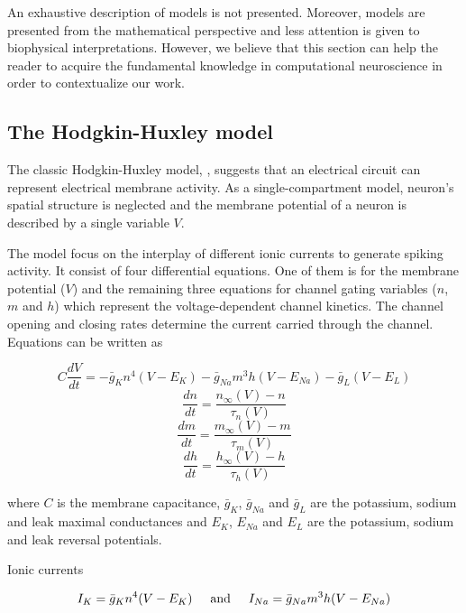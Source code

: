 An exhaustive description of models is not presented. Moreover, models are presented from the mathematical perspective and less attention is given to biophysical interpretations. However, we believe that this section can help the reader to acquire the fundamental knowledge in computational neuroscience in order to contextualize our work.


\subsection{The Hodgkin-Huxley model}
The classic Hodgkin-Huxley model, \cite{Hodgkin1990}, suggests that an electrical circuit can represent electrical membrane activity. As a single-compartment model, neuron's spatial structure is neglected and the membrane potential of a neuron is described by a single variable $V$.

The model focus on the interplay of different ionic currents to generate spiking activity. It consist of four differential equations. One of them is for the membrane potential ($V$) and the remaining three equations for channel gating variables ($n$, $m$ and $h$) which represent the voltage-dependent channel kinetics. The channel opening and closing rates determine the current carried through the channel. Equations can be written as

\begin{equation}
    C\frac{dV}{dt} = - \bar{g}_{K}n^{4}(V-E_{K}) - \bar{g}_{Na}m^{3}h(V-E_{Na}) - \bar{g}_{L}(V-E_{L})
\end{equation}
\begin{equation}
    \frac{dn}{dt} = \frac{n_{\infty}(V)-n}{\tau_{n}(V)}
\end{equation}
\begin{equation}
    \frac{dm}{dt} = \frac{m_{\infty}(V)-m}{\tau_{m}(V)}
\end{equation}
\begin{equation}
    \frac{dh}{dt} = \frac{h_{\infty}(V)-h}{\tau_{h}(V)}
\end{equation}

where $C$ is the membrane capacitance, $\bar{g}_{K}$, $\bar{g}_{Na}$ and $\bar{g}_{L}$ are the potassium, sodium and leak maximal conductances and $E_{K}$, $E_{Na}$ and $E_{L}$ are the potassium, sodium and leak reversal potentials.

Ionic currents 

\begin{equation}
    I_{K} = \bar{g}_{K}n^{4}(V-E_{K}) \hspace{0.5cm} \text{and} \hspace{0.5cm} I_{Na} = \bar{g}_{Na}m^{3}h(V-E_{Na})
\end{equation}

